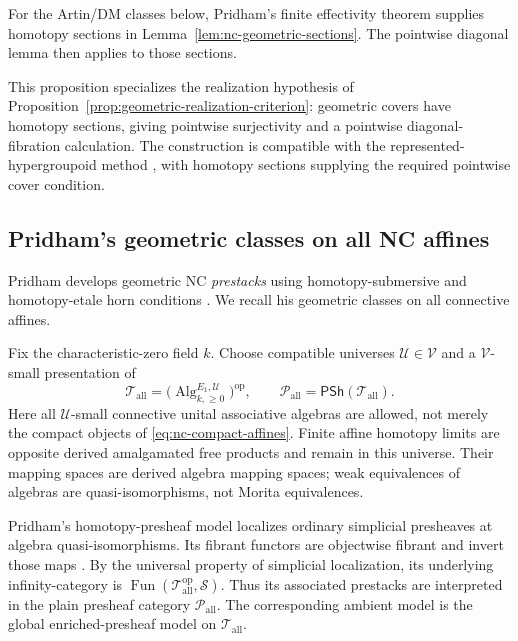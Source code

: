 \documentclass[12pt]{amsart}
\theoremstyle{definition}
\theoremstyle{remark}
\numberwithin{equation}{section}
\newcommand{\PSh}{\mathsf{PSh}}
\newcommand{\op}{\mathrm{op}}
\DeclareMathOperator{\Fun}{Fun}
\begin{document}
For the Artin/DM classes below, Pridham's finite effectivity
theorem supplies homotopy sections in
Lemma~\ref{lem:nc-geometric-sections}. The pointwise
diagonal lemma then applies to those sections.

This proposition specializes the realization
hypothesis of
Proposition~\ref{prop:geometric-realization-criterion}: geometric
covers have homotopy sections, giving pointwise surjectivity and a
pointwise diagonal-fibration calculation. The construction is
compatible with the represented-hypergroupoid method
\cite{Pridham2013}, with homotopy sections supplying
the required pointwise cover condition.

\subsection{Pridham's geometric classes on all NC affines}
\label{subsec:nc-geometric-classes}

Pridham develops geometric NC \emph{prestacks} using
homotopy-submersive and homotopy-etale horn conditions
\cite[Introduction and Definitions~1.19--1.23]{PridhamNC2023}.
We recall his geometric classes on all connective affines.

Fix the characteristic-zero field $k$. Choose compatible universes
$\mathcal U\in\mathcal V$ and a $\mathcal V$-small presentation of
\[
 \mathcal T_{\mathrm{all}}
   =\bigl(\operatorname{Alg}_{k,\ge0}^{E_1,\mathcal U}\bigr)^{\op},
 \qquad
 \mathcal P_{\mathrm{all}}=\PSh(\mathcal T_{\mathrm{all}}).
\]
Here all $\mathcal U$-small connective unital associative algebras
are allowed, not merely the compact objects of
\eqref{eq:nc-compact-affines}. Finite affine homotopy limits are
opposite derived amalgamated free products and remain in this
universe. Their mapping spaces are derived algebra mapping spaces;
weak equivalences of algebras are quasi-isomorphisms, not Morita
equivalences.

Pridham's homotopy-presheaf model localizes ordinary
simplicial presheaves at algebra quasi-isomorphisms. Its fibrant
functors are objectwise fibrant and invert those maps
\cite[Definition~1.19 and the following paragraph,
p.~9]{PridhamNC2023}. By the universal property of simplicial
localization, its underlying infinity-category is
$\Fun(\mathcal T_{\mathrm{all}}^{\op},\mathcal S)$. Thus its
associated prestacks are interpreted in the plain presheaf
category $\mathcal P_{\mathrm{all}}$. The corresponding
ambient model is the global enriched-presheaf model on
$\mathcal T_{\mathrm{all}}$.
\end{document}
